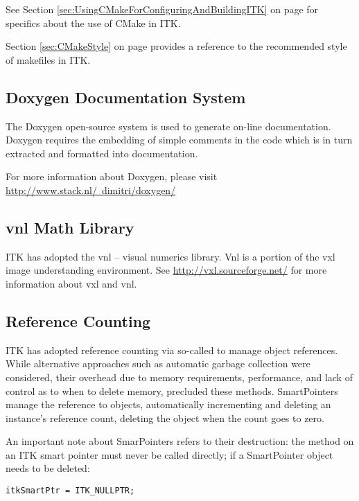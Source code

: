 See Section \ref{sec:UsingCMakeForConfiguringAndBuildingITK} on page
\pageref{sec:UsingCMakeForConfiguringAndBuildingITK} for specifics about the use
of CMake in ITK.

Section \ref{sec:CMakeStyle} on page \pageref{sec:CMakeStyle} provides a
reference to the recommended style of makefiles in ITK.

\subsection{Doxygen Documentation System}
\label{subsec:DoxygenDocumentationSystem}

The Doxygen open-source system is used to generate on-line documentation.
Doxygen requires the embedding of simple comments in the code which is in turn
extracted and formatted into documentation.

For more information about Doxygen, please visit
\href{http://www.stack.nl/~dimitri/doxygen/}{http://www.stack.nl/~dimitri/doxygen/}

\subsection{vnl Math Library}
\label{subsec:vnlMathLibrary}

ITK has adopted the vnl -- visual numerics library. Vnl is a portion of the vxl image
understanding environment. See \href{http://vxl.sourceforge.net/}{http://vxl.sourceforge.net/}
for more information about vxl and vnl.


\subsection{Reference Counting}
\label{subsec:ReferenceCounting}

ITK has adopted reference counting via so-called  to
manage object references. While alternative approaches such as automatic garbage
collection were considered, their overhead due to memory requirements,
performance, and lack of control as to when to delete memory, precluded these
methods. SmartPointers manage the reference to objects, automatically
incrementing and deleting an instance's reference count, deleting the object
when the count goes to zero.

An important note about SmarPointers refers to their destruction: the
 method on an ITK smart pointer must never be called directly; if
a SmartPointer object  needs to be deleted:
\small
\begin{verbatim}
itkSmartPtr = ITK_NULLPTR;
\end{verbatim}
\normalsize

